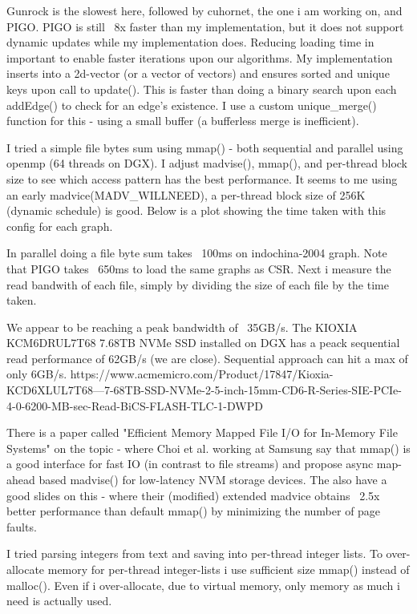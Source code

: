Gunrock is the slowest here, followed by cuhornet, the one i am working on, and PIGO. PIGO is still ~8x faster than my implementation, but it does not support dynamic updates while my implementation does. Reducing loading time in important to enable faster iterations upon our algorithms.
My implementation inserts into a 2d-vector (or a vector of vectors) and ensures sorted and unique keys upon call to update(). This is faster than doing a binary search upon each addEdge() to check for an edge's existence. I use a custom unique\_merge() function for this - using a small buffer (a bufferless merge is inefficient).

I tried a simple file bytes sum using mmap() - both sequential and parallel using openmp (64 threads on DGX). I adjust madvise(), mmap(), and per-thread block size to see which access pattern has the best performance.
It seems to me using an early madvice(MADV\_WILLNEED), a per-thread block size of 256K (dynamic schedule) is good. Below is a plot showing the time taken with this config for each graph.

In parallel doing a file byte sum takes ~100ms on indochina-2004 graph. Note that PIGO takes ~650ms to load the same graphs as CSR. Next i measure the read bandwith of each file, simply by dividing the size of each file by the time taken.

We appear to be reaching a peak bandwidth of ~35GB/s. The KIOXIA KCM6DRUL7T68 7.68TB NVMe SSD installed on DGX has a peack sequential read performance of 62GB/s (we are close). Sequential approach can hit a max of only 6GB/s.
https://www.acmemicro.com/Product/17847/Kioxia-KCD6XLUL7T68---7-68TB-SSD-NVMe-2-5-inch-15mm-CD6-R-Series-SIE-PCIe-4-0-6200-MB-sec-Read-BiCS-FLASH-TLC-1-DWPD

There is a paper called "Efficient Memory Mapped File I/O for In-Memory File Systems" on the topic - where Choi et al. working at Samsung say that mmap() is a good interface for fast IO (in contrast to file streams) and propose async map-ahead based madvise() for low-latency NVM storage devices. The also have a good slides on this - where their (modified) extended madvice obtains ~2.5x better performance than default mmap() by minimizing the number of page faults.

I tried parsing integers from text and saving into per-thread integer lists. To over-allocate memory for per-thread integer-lists i use sufficient size mmap() instead of malloc(). Even if i over-allocate, due to virtual memory, only memory as much i need is actually used.


